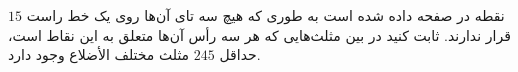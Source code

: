 $15$ 
نقطه در صفحه داده شده است به طوری که هیچ سه تای آن‌ها روی یک خط راست قرار ندارند. ثابت کنید در بین مثلث‌هایی که هر سه رأس آن‌ها متعلق به این نقاط است، حداقل
$245$ 
مثلث مختلف الأضلاع وجود دارد. 